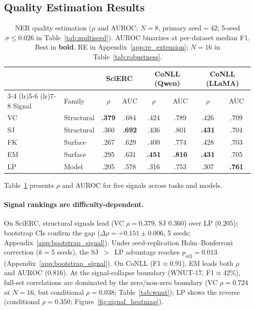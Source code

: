 \subsection{Quality Estimation Results}\label{sec:qe_results}

\begin{table}[t]
\centering
\small
\caption{NER quality estimation ($\rho$ and AUROC; $N{=}8$, primary seed${=}42$; 5-seed $\sigma{\leq}0.026$ in Table~\ref{tab:multiseed}). AUROC binarizes at per-dataset median F1. Best in \textbf{bold}. RE in Appendix~\ref{app:re_extension}; $N{=}16$ in Table~\ref{tab:robustness}.}
\label{tab:quality_estimation}
\begin{tabular}{ll cc cc cc}
\toprule
& & \multicolumn{2}{c}{\textbf{SciERC}} & \multicolumn{2}{c}{\textbf{CoNLL (Qwen)}} & \multicolumn{2}{c}{\textbf{CoNLL (LLaMA)}} \\
\cmidrule(lr){3-4} \cmidrule(lr){5-6} \cmidrule(lr){7-8}
Signal & Family & $\rho$ & AUC & $\rho$ & AUC & $\rho$ & AUC \\
\midrule
VC & Structural & \textbf{.379} & .684 & .424 & .789 & .426 & .709 \\
SJ  & Structural & .360 & \textbf{.692} & .436 & .801 & \textbf{.431} & .704 \\
FK & Surface & .267 & .629 & .400 & .774 & .428 & .703 \\
EM  & Surface    & .295 & .631 & \textbf{.451} & \textbf{.816} & \textbf{.431} & .705 \\
\midrule
LP     & Model      & .205 & .578 & .316 & .753 & .307 & \textbf{.761} \\
\bottomrule
\end{tabular}
\end{table}

Table~\ref{tab:quality_estimation} presents $\rho$ and AUROC for five signals across tasks and models.

\paragraph{Signal rankings are difficulty-dependent.}
On SciERC, structural signals lead (VC $\rho{=}0.379$, SJ $0.360$) over LP ($0.205$); bootstrap CIs confirm the gap ($\Delta\rho{=}{+}0.151{\pm}0.006$, 5 seeds; Appendix~\ref{app:bootstrap_signal}).
Under seed-replication Holm--Bonferroni correction ($k{=}5$ seeds), the SJ~${>}$~LP advantage reaches $p_{\text{adj}}{=}0.013$ (Appendix~\ref{app:bootstrap_signal}).
On CoNLL (F1${\approx}$0.91), EM leads both $\rho$ and AUROC ($0.816$).
At the signal-collapse boundary (WNUT-17, F1${\approx}$42\%), full-set correlations are dominated by the zero/non-zero boundary (VC $\rho{=}0.724$ at $N{=}16$, but conditional $\rho{=}0.038$; Table~\ref{tab:wnut}); LP shows the reverse (conditional $\rho{=}0.350$; Figure~\ref{fig:signal_heatmap}).

